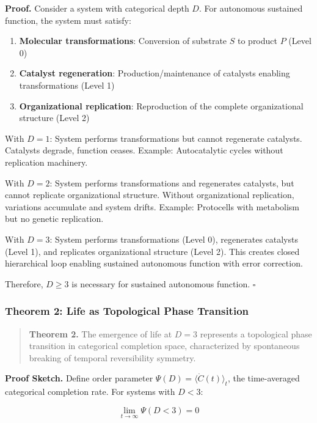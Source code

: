 \documentclass[11pt]{article}
\begin{document}
\textbf{Proof.} Consider a system with categorical depth $D$. For autonomous sustained function, the system must satisfy:
\begin{enumerate}
\item \textbf{Molecular transformations}: Conversion of substrate $S$ to product $P$ (Level 0)
\item \textbf{Catalyst regeneration}: Production/maintenance of catalysts enabling transformations (Level 1)
\item \textbf{Organizational replication}: Reproduction of the complete organizational structure (Level 2)
\end{enumerate}

With $D = 1$: System performs transformations but cannot regenerate catalysts. Catalysts degrade, function ceases. Example: Autocatalytic cycles without replication machinery.

With $D = 2$: System performs transformations and regenerates catalysts, but cannot replicate organizational structure. Without organizational replication, variations accumulate and system drifts. Example: Protocells with metabolism but no genetic replication.

With $D = 3$: System performs transformations (Level 0), regenerates catalysts (Level 1), and replicates organizational structure (Level 2). This creates closed hierarchical loop enabling sustained autonomous function with error correction.

Therefore, $D \geq 3$ is necessary for sustained autonomous function. $\square$

\subsubsection{Theorem 2: Life as Topological Phase Transition}

\begin{quote}
\textbf{Theorem 2.} The emergence of life at $D = 3$ represents a topological phase transition in categorical completion space, characterized by spontaneous breaking of temporal reversibility symmetry.
\end{quote}

\textbf{Proof Sketch.} Define order parameter $\Psi(D) = \langle \dot{C}(t) \rangle_t$, the time-averaged categorical completion rate. For systems with $D < 3$:

\begin{equation}
\lim_{t \to \infty} \Psi(D < 3) = 0
\end{equation}
\end{document}
